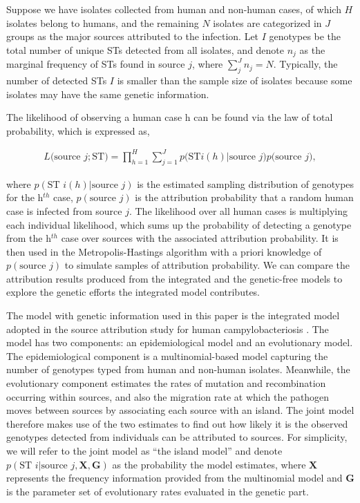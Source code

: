 \documentclass[times, doublespace]{WileyNJD-v2}%
\begin{document}
Suppose we have isolates collected from human and non-human cases, of which $H$ isolates belong to humans, and the remaining $N$ isolates are categorized in $J$ groups as the major sources attributed to the infection. Let $I$ genotypes be the total number of unique STs detected from all isolates, and denote $n_j$ as the marginal frequency of STs found in source $j$, where $\sum_j^J n_j = N$. Typically, the number of detected STs $I$ is smaller than the sample size of isolates because some isolates may have the same genetic information.

The likelihood of observing a human case h can be found via the law of total probability, which is expressed as,

\begin{align}
  L\Big(\text{source }j; \text{ST} \Big)=\prod_{h=1}^{H}\sum_{j=1}^{J} p\Big(\text{ST}i(h) \vert \text{source } j\Big) p\Big(\text{source }j\Big),
  \label{Olikh}
\end{align}

where $p(\text{ST }i(h)\vert \text{source }j)$ is the estimated sampling distribution of genotypes for the h$^{th}$ case, $p(\text{source }j)$ is the attribution probability that a random human case is infected from source $j$. The likelihood over all human cases is multiplying each individual likelihood, which sums up the probability of detecting a genotype from the h$^{th}$ case over sources with the associated attribution probability. It is then used in the Metropolis-Hastings algorithm with a priori knowledge of $p(\text{source }j)$ to simulate samples of attribution probability. We can compare the attribution results produced from the integrated and the genetic-free models to explore the genetic efforts the integrated model contributes.

The model with genetic information used in this paper is the integrated model \cite{Wilso} adopted in the source attribution study for human campylobacteriosis \cite{Marsh}. The model has two components: an epidemiological model and an evolutionary model. The epidemiological component is a multinomial-based model capturing the number of genotypes typed from human and non-human isolates. Meanwhile, the evolutionary component estimates the rates of mutation and recombination occurring within sources, and also the migration rate at which the pathogen moves between sources by associating each source with an island. The joint model therefore makes use of the two estimates to find out how likely it is the observed genotypes detected from individuals can be attributed to sources. For simplicity, we will refer to the joint model as ``the island model'' and denote $p(\text{ST }i\vert \text{source }j, \boldsymbol{X}, \boldsymbol{G})$ as the probability the model estimates, where $\boldsymbol{X}$ represents the frequency information provided from the multinomial model and $\boldsymbol{G}$ is the parameter set of evolutionary rates evaluated in the genetic part.
\end{document}
